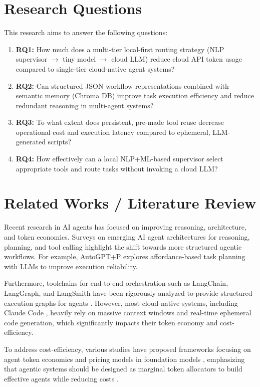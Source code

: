 \documentclass[12pt,a4paper]{article}
\begin{document}
\section{Research Questions}
This research aims to answer the following questions:
\begin{enumerate}
    \item \textbf{RQ1:} How much does a multi-tier local-first routing strategy (NLP supervisor $\rightarrow$ tiny model $\rightarrow$ cloud LLM) reduce cloud API token usage compared to single-tier cloud-native agent systems?
    \item \textbf{RQ2:} Can structured JSON workflow representations combined with semantic memory (Chroma DB) improve task execution efficiency and reduce redundant reasoning in multi-agent systems?
    \item \textbf{RQ3:} To what extent does persistent, pre-made tool reuse decrease operational cost and execution latency compared to ephemeral, LLM-generated scripts?
    \item \textbf{RQ4:} How effectively can a local NLP+ML-based supervisor select appropriate tools and route tasks without invoking a cloud LLM?
\end{enumerate}

\section{Related Works / Literature Review}
Recent research in AI agents has focused on improving reasoning, architecture, and token economics. Surveys on emerging AI agent architectures for reasoning, planning, and tool calling \cite{agent_survey} highlight the shift towards more structured agentic workflows. For example, AutoGPT+P \cite{autogpt_p} explores affordance-based task planning with LLMs to improve execution reliability.

\medskip

\noindent Furthermore, toolchains for end-to-end orchestration such as LangChain, LangGraph, and LangSmith have been rigorously analyzed to provide structured execution graphs for agents \cite{langchain_langgraph}. However, most cloud-native systems, including Claude Code \cite{claude_code_dive}, heavily rely on massive context windows and real-time ephemeral code generation, which significantly impacts their token economy and cost-efficiency.

\medskip

\noindent To address cost-efficiency, various studies have proposed frameworks focusing on agent token economics \cite{token_economics} and pricing models in foundation models \cite{ai_tokenomics}, emphasizing that agentic systems should be designed as marginal token allocators \cite{marginal_token} to build effective agents while reducing costs \cite{efficient_agents}. 
\end{document}

